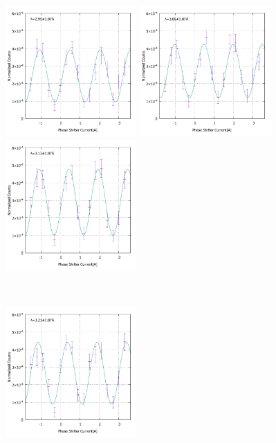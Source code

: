 \begin{figure}[h]
\begin{minipage}{0.33\hsize}
\includegraphics[width=5cm]{discussion/IF_nb/Interference_nb_fit420.pdf}
\end{minipage}
\begin{minipage}{0.33\hsize}
\includegraphics[width=5cm]{discussion/IF_nb/Interference_nb_fit430.pdf}
\end{minipage}
\begin{minipage}{0.33\hsize}
\includegraphics[width=5cm]{discussion/IF_nb/Interference_nb_fit440.pdf}
\end{minipage}\\
\begin{minipage}{0.33\hsize}
\includegraphics[width=5cm]{discussion/IF_nb/Interference_nb_fit450.pdf}

\end{minipage}
\end{figure}
